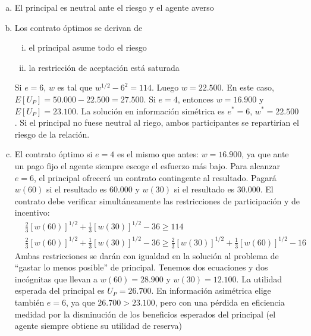 \begin{enumerate}[a)]
	\item El principal es neutral ante el riesgo y el agente averso
	\item Los contrato óptimos se derivan de 
				\begin{enumerate}[i)]
					\item el principal asume todo el riesgo
					\item la restricción de aceptación está saturada
				\end{enumerate}
			Si $e=6$, $w$ es tal que $w^{1/2} - 6^2 =114$. Luego $w=22.500$. En este caso, $E[U_P] = 50.000-22.500=27.500$. Si $e=4$, entonces $w=16.900$ y $E[U_P]=23.100$. La solución en información simétrica es $e^*=6$, $w^*=22.500$. Si el principal no fuese neutral al riego, ambos participantes se repartirían el riesgo de la relación.
	\item El contrato óptimo si $e=4$ es el mismo que antes: $w=16.900$, ya que ante un pago fijo el agente siempre escoge el esfuerzo más bajo. Para alcanzar $e=6$, el principal ofrecerá un contrato contingente al resultado. Pagará $w(60)$ si el resultado es 60.000 y $w(30)$ si el resultado es 30.000. El contrato debe verificar simultáneamente las restricciones de participación y de incentivo:
				\begin{align*}
					& \frac{2}{3}\left[w(60) \right]^{1/2}+\frac{1}{3}\left[w(30) \right]^{1/2} - 36 \geq 114\\
					& \frac{2}{3}\left[w(60) \right]^{1/2}+\frac{1}{3}\left[w(30) \right]^{1/2} - 36 \geq \frac{2}{3}\left[w(30) \right]^{1/2}+\frac{1}{3}\left[w(60) \right]^{1/2} - 16
				\end{align*}
			Ambas restricciones se darán con igualdad en la solución al problema de ``gastar lo menos posible'' de principal. Tenemos dos ecuaciones y dos incógnitas que llevan a $w(60)=28.900$ y $w(30)=12.100$. La utilidad esperada del principal es $U_P=26.700$. En información asimétrica elige también $e=6$, ya que $26.700 > 23.100$, pero con una pérdida en eficiencia medidad por la disminución de los beneficios esperados del principal (el agente siempre obtiene su utilidad de reserva)
\end{enumerate}